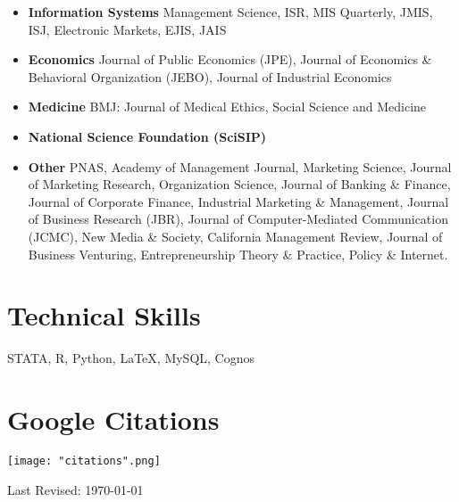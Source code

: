 \documentclass[10.5pt,letterpaper,sans]{moderncv}        %
\begin{document}
\begin{itemize}
  \item \textbf{Information Systems} \newline 
  Management Science, ISR, MIS Quarterly, JMIS, ISJ, Electronic Markets, EJIS, JAIS
  \item \textbf{Economics} \newline
  Journal of Public Economics (JPE), Journal of Economics \& Behavioral Organization (JEBO), Journal of Industrial Economics
\item \textbf{Medicine} \newline
 BMJ: Journal of Medical Ethics, Social Science and Medicine
 \item \textbf{National Science Foundation (SciSIP)}
  \item \textbf{Other} \newline 
PNAS, Academy of Management Journal, Marketing Science, Journal of Marketing Research, Organization Science, Journal of Banking \& Finance, Journal of Corporate Finance, Industrial Marketing \& Management, Journal of Business Research (JBR), Journal of Computer-Mediated Communication (JCMC), New Media \& Society, California Management Review, Journal of Business Venturing, Entrepreneurship Theory \& Practice, Policy \& Internet.
\end{itemize}

\section{Technical Skills}

STATA, R, Python, \LaTeX, MySQL, Cognos\newline

\section{Google Citations}

\begin{minipage}{.5\linewidth}
   \texttt{[image: "citations".png]}
\end{minipage}

\bigskip

Last Revised: \today
\end{document}
